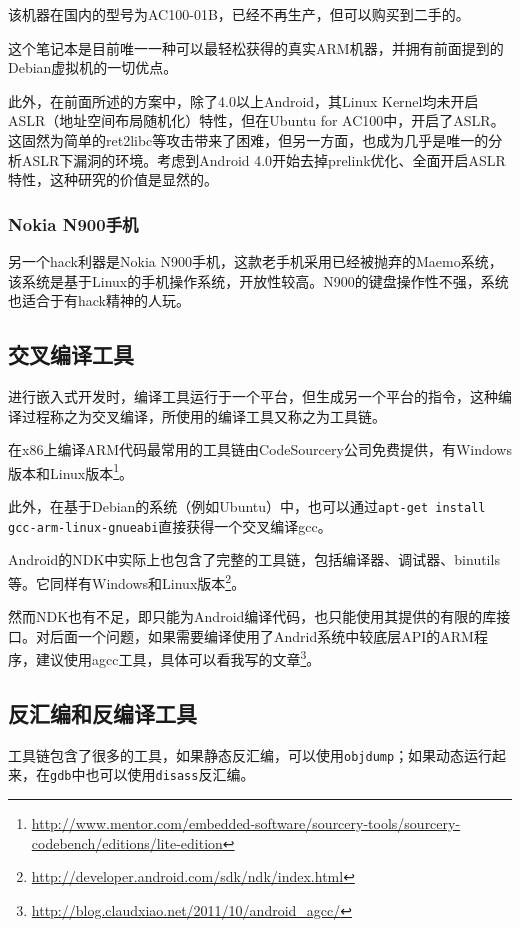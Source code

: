 该机器在国内的型号为AC100-01B，已经不再生产，但可以购买到二手的。

这个笔记本是目前唯一一种可以最轻松获得的真实ARM机器，并拥有前面提到的Debian虚拟机的一切优点。

此外，在前面所述的方案中，除了4.0以上Android，其Linux Kernel均未开启ASLR（地址空间布局随机化）特性，但在Ubuntu for AC100中，开启了ASLR。这固然为简单的ret2libc等攻击带来了困难，但另一方面，也成为几乎是唯一的分析ASLR下漏洞的环境。考虑到Android 4.0开始去掉prelink优化、全面开启ASLR特性\cite{aslr_android}，这种研究的价值是显然的。

\subsubsection{Nokia N900手机}
另一个hack利器是Nokia N900手机，这款老手机采用已经被抛弃的Maemo系统，该系统是基于Linux的手机操作系统，开放性较高。N900的键盘操作性不强，系统也适合于有hack精神的人玩。
\subsection{交叉编译工具}
进行嵌入式开发时，编译工具运行于一个平台，但生成另一个平台的指令，这种编译过程称之为交叉编译，所使用的编译工具又称之为工具链。

在x86上编译ARM代码最常用的工具链由CodeSourcery公司免费提供，有Windows版本和Linux版本\footnote{\href{http://www.mentor.com/embedded-software/sourcery-tools/sourcery-codebench/editions/lite-edition}{http://www.mentor.com/embedded-software/sourcery-tools/sourcery-codebench/editions/lite-edition}}。

此外，在基于Debian的系统（例如Ubuntu）中，也可以通过\lstinline!apt-get install gcc-arm-linux-gnueabi!直接获得一个交叉编译gcc。

Android的NDK中实际上也包含了完整的工具链，包括编译器、调试器、binutils等。它同样有Windows和Linux版本\footnote{\href{http://developer.android.com/sdk/ndk/index.html}{http://developer.android.com/sdk/ndk/index.html}}。

然而NDK也有不足，即只能为Android编译代码，也只能使用其提供的有限的库接口。对后面一个问题，如果需要编译使用了Andrid系统中较底层API的ARM程序，建议使用agcc工具，具体可以看我写的文章\footnote{\href{http://blog.claudxiao.net/2011/10/android_agcc/}{http://blog.claudxiao.net/2011/10/android\_agcc/}}。
\subsection{反汇编和反编译工具}
工具链包含了很多的工具，如果静态反汇编，可以使用\lstinline!objdump!；如果动态运行起来，在\lstinline!gdb!中也可以使用\lstinline!disass!反汇编。

